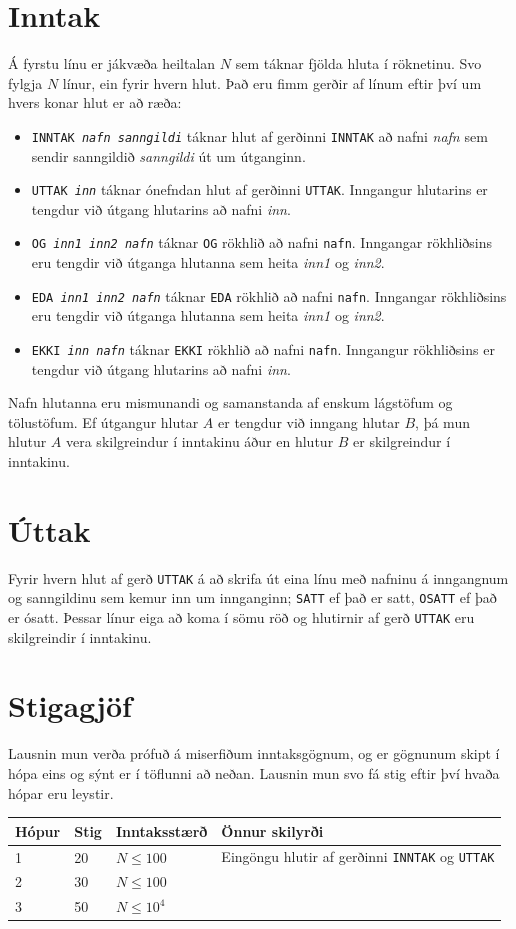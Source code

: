 \section*{Inntak}
Á fyrstu línu er jákvæða heiltalan $N$ sem táknar fjölda hluta í
röknetinu. Svo fylgja $N$ línur, ein fyrir hvern hlut. Það eru fimm gerðir af
línum eftir því um hvers konar hlut er að ræða:
\begin{itemize}
\item \texttt{INNTAK \textit{nafn} \textit{sanngildi}} táknar hlut af gerðinni \texttt{INNTAK} að nafni \textit{nafn} sem sendir sanngildið \textit{sanngildi} út um útganginn.
\item \texttt{UTTAK \textit{inn}} táknar ónefndan hlut af gerðinni \texttt{UTTAK}. Inngangur hlutarins er tengdur við útgang hlutarins að nafni \textit{inn}.
\item \texttt{OG \textit{inn1} \textit{inn2} \textit{nafn}} táknar \texttt{OG} rökhlið að nafni \texttt{nafn}. Inngangar rökhliðsins eru tengdir við útganga hlutanna sem heita \textit{inn1} og \textit{inn2}.
\item \texttt{EDA \textit{inn1} \textit{inn2} \textit{nafn}} táknar \texttt{EDA} rökhlið að nafni \texttt{nafn}. Inngangar rökhliðsins eru tengdir við útganga hlutanna sem heita \textit{inn1} og \textit{inn2}.
\item \texttt{EKKI \textit{inn} \textit{nafn}} táknar \texttt{EKKI} rökhlið að nafni \texttt{nafn}. Inngangur rökhliðsins er tengdur við útgang hlutarins að nafni \textit{inn}.
\end{itemize}

Nafn hlutanna eru mismunandi og samanstanda af enskum lágstöfum og tölustöfum.
Ef útgangur hlutar $A$ er tengdur við inngang hlutar $B$, þá mun hlutur $A$
vera skilgreindur í inntakinu áður en hlutur $B$ er skilgreindur í inntakinu.

\section*{Úttak}
Fyrir hvern hlut af gerð \texttt{UTTAK} á að skrifa út eina línu með nafninu á
inngangnum og sanngildinu sem kemur inn um innganginn; \texttt{SATT} ef það er
satt, \texttt{OSATT} ef það er ósatt. Þessar línur eiga að koma í sömu röð og
hlutirnir af gerð \texttt{UTTAK} eru skilgreindir í inntakinu.

\section*{Stigagjöf}
Lausnin mun verða prófuð á miserfiðum inntaksgögnum, og er gögnunum skipt í
hópa eins og sýnt er í töflunni að neðan. Lausnin mun svo fá stig eftir því
hvaða hópar eru leystir.

\begin{tabular}{|l|l|l|l|}
\hline
Hópur & Stig & Inntaksstærð & Önnur skilyrði \\ \hline
1 & 20 & $N \leq 100$ & Eingöngu hlutir af gerðinni \texttt{INNTAK} og \texttt{UTTAK} \\ \hline
2 & 30 & $N \leq 100$ & \\ \hline
3 & 50 & $N \leq 10^4$ & \\ \hline
\end{tabular}
